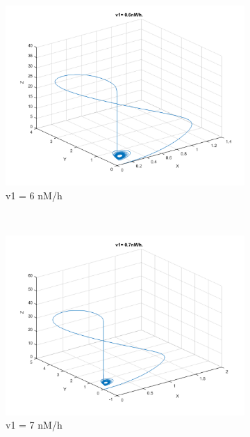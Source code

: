 \documentclass[10pt,a4paper,oneside,twocolumn]{article}
\numberwithin{equation}{section} %
\begin{document}
\begin{figure}
	\begin{subfigure}[b]{0.3\textwidth}
	    \includegraphics[width=\textwidth]{LotsofthesameA/A-AA6.png}
	    \caption{v1 = 6 nM/h}
	\end{subfigure}
	~ 
	\begin{subfigure}[b]{0.3\textwidth}
	    \includegraphics[width=\textwidth]{LotsofthesameA/A-AA7.png}
	    \caption{v1 = 7 nM/h}
	\end{subfigure}
	~ 
	\begin{subfigure}[b]{0.3\textwidth}

\end{subfigure}
\end{figure}
\end{document}
